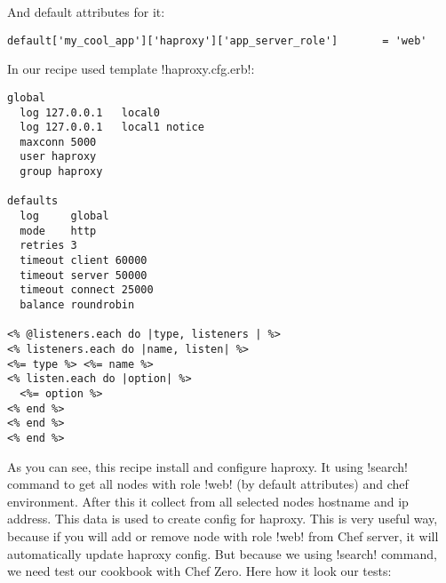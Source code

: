 And default attributes for it:

\begin{lstlisting}[label=lst:testing-chef-zero13]
default['my_cool_app']['haproxy']['app_server_role']       = 'web'
\end{lstlisting}

In our recipe used template \inline!haproxy.cfg.erb!:

\begin{lstlisting}[label=lst:testing-chef-zero14]
global
  log 127.0.0.1   local0
  log 127.0.0.1   local1 notice
  maxconn 5000
  user haproxy
  group haproxy

defaults
  log     global
  mode    http
  retries 3
  timeout client 60000
  timeout server 50000
  timeout connect 25000
  balance roundrobin

<% @listeners.each do |type, listeners | %>
<% listeners.each do |name, listen| %>
<%= type %> <%= name %>
<% listen.each do |option| %>
  <%= option %>
<% end %>
<% end %>
<% end %>
\end{lstlisting}

As you can see, this recipe install and configure haproxy. It using \inline!search! command to get all nodes with role \inline!web! (by default attributes) and chef environment. After this it collect from all selected nodes hostname and ip address. This data is used to create config for haproxy. This is very useful way, because if you will add or remove node with role \inline!web! from Chef server, it will automatically update haproxy config. But because we using \inline!search! command, we need test our cookbook with Chef Zero. Here how it look our tests:


